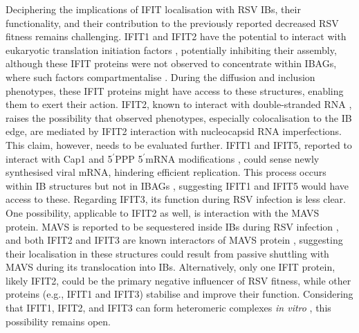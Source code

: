 Deciphering the implications of IFIT localisation with RSV IBs, their functionality, and their contribution to the previously reported decreased RSV fitness remains challenging. IFIT1 and IFIT2 have the potential to interact with eukaryotic translation initiation factors \cite{Diamond2014IFIT1:Translation, Guo2000CharacterizationVirus}, potentially inhibiting their assembly, although these IFIT proteins were not observed to concentrate within IBAGs, where such factors compartmentalise \cite{Jobe2024ViralCondensates}. During the diffusion and inclusion phenotypes, these IFIT proteins might have access to these structures, enabling them to exert their action. IFIT2, known to interact with double-stranded RNA \cite{Yang2012CrystalMechanisms}, raises the possibility that observed phenotypes, especially colocalisation to the IB edge, are mediated by IFIT2 interaction with nucleocapsid RNA imperfections. This claim, however, needs to be evaluated further. IFIT1 and IFIT5, reported to interact with Cap1 and 5$^{\prime}$PPP 5$^{\prime}$mRNA modifications \cite{Kumar2014InhibitionMRNAs}, could sense newly synthesised viral mRNA, hindering efficient replication. This process occurs within IB structures but not in IBAGs \cite{Rincheval2017FunctionalVirus}, suggesting IFIT1 and IFIT5 would have access to these. Regarding IFIT3, its function during RSV infection is less clear. One possibility, applicable to IFIT2 as well, is interaction with the MAVS protein. MAVS is reported to be sequestered inside IBs during RSV infection \cite{Lifland2012HumanMAVS}, and both IFIT2 and IFIT3 are known interactors of MAVS protein \cite{Chen2017InhibitionApoptosis, Diamond2013TheProteins, Liu2011IFN-InducedTBK1}, suggesting their localisation in these structures could result from passive shuttling with MAVS during its translocation into IBs. Alternatively, only one IFIT protein, likely IFIT2, could be the primary negative influencer of RSV fitness, while other proteins (e.g., IFIT1 and IFIT3) stabilise and improve their function. Considering that IFIT1, IFIT2, and IFIT3 can form heteromeric complexes \textit{in vitro} \cite{Mears2018BetterResponse}, this possibility remains open.

